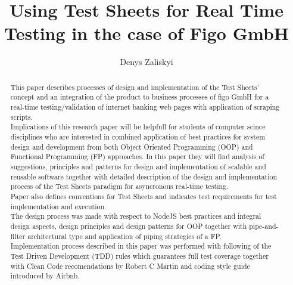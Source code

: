 \documentclass{llncs}
\begin{document}
\frontmatter          %
%
\pagestyle{headings}  %
%
\mainmatter              %


%
\title{Using Test Sheets for Real Time Testing in the case of Figo GmbH}

\author{Denys Zaliskyi}


\maketitle              %

\begin{abstract}
This paper describes processes of design and implementation of the Test Sheets' concept and an integration of the product to business processes of figo GmbH for a real-time testing/validation of internet banking web pages with application of scraping scripts.\\
Implications of this research paper will be helpfull for students of computer scince disciplines who are interested in combined application of best practices for system design and development from both Object Oriented Programming (OOP) and Functional Programming (FP) approaches. In this paper they will find analysis of suggestions, principles and patterns for design and implementation of scalable and reusable software together with detailed description of the design and implementation process of the Test Sheets paradigm for asyncronous real-time testing.\\ 
Paper also defines conventions for Test Sheets and indicates test requirements for test implementation and execution.\\
The design process was made with respect to NodeJS best practices and integral design aspects, design principles and design patterns for OOP together with pipe-and-filter architectural type and application of piping strategies of a FP.\\
Implementation process described in this paper was performed with following of the Test Driven Development (TDD) rules which guarantees full test coverage together with Clean Code recomendations by Robert C Martin and coding style guide introduced by Airbnb.\\
\end{abstract}
\end{document}
